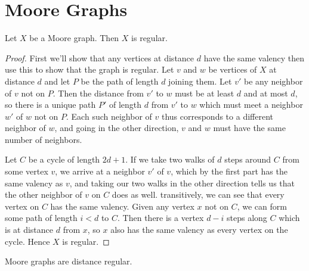 \section*{Moore Graphs}

\begin{lemma}
	Let $X$ be a Moore graph.  Then $X$ is regular.
\end{lemma}

\begin{proof}
	First we'll show that any vertices at distance $d$ have the same valency then use this to show that the graph is regular.  Let $v$ and $w$ be vertices of $X$ at distance $d$ and let $P$ be the path of length $d$ joining them.  Let $v'$ be any neighbor of $v$ not on $P$.  Then the distance from $v'$ to $w$ must be at least $d$ and at most $d$, so there is a unique path $P'$ of length $d$ from $v'$ to $w$ which must meet a neighbor $w'$ of $w$ not on $P$.  Each such neighbor of $v$ thus corresponds to a different neighbor of $w$, and going in the other direction, $v$ and $w$ must have the same number of neighbors.
	
	Let $C$ be a cycle of length $2d+1$.  If we take two walks of $d$ steps around $C$ from some vertex $v$, we arrive at a neighbor $v'$ of $v$, which by the first part has the same valency as $v$, and taking our two walks in the other direction tells us that the other neighbor of $v$ on $C$ does as well.  transitively, we can see that every vertex on $C$ has the same valency.  Given any vertex $x$ not on $C$, we can form some path of length $i<d$ to $C$.  Then there is a vertex $d-i$ steps along $C$ which is at distance $d$ from $x$, so $x$ also has the same valency as every vertex on the cycle.  Hence $X$ is regular.
\end{proof}
\begin{theorem}
	Moore graphs are distance regular.
\end{theorem}
